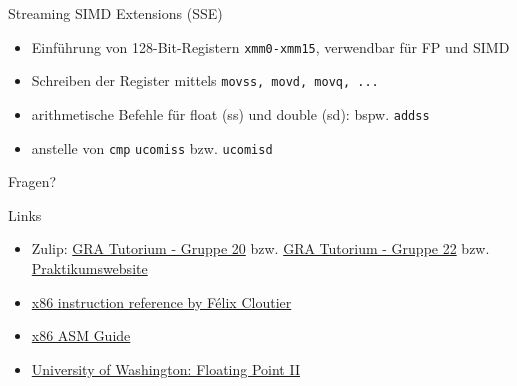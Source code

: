 \documentclass[
  german,            %
  aspectratio=169,    %
]{tumbeamer}
\begin{document}
\begin{frame}[c, fragile]{Streaming SIMD Extensions (SSE)}{}
  \begin{itemize}
    \item Einführung von 128-Bit-Registern \verb|xmm0-xmm15|, verwendbar für FP und SIMD
    \item Schreiben der Register mittels \verb|movss, movd, movq, ...|
    \item arithmetische Befehle für float (ss) und double (sd): bspw. \verb|addss|
    \item anstelle von \verb|cmp| \verb|ucomiss| bzw. \verb|ucomisd|
  \end{itemize}
\end{frame}

\begin{frame}[c]{}{}
  \begin{center}
    \LARGE Fragen?
  \end{center}
\end{frame}

\begin{frame}[fragile, c]{Links}{}
  \begin{itemize}
    \item Zulip: \href{https://zulip.in.tum.de/#narrow/stream/2267-GRA-Tutorium---Gruppe-20}{\glqq GRA Tutorium - Gruppe 20\grqq}
          bzw. \href{https://zulip.in.tum.de/#narrow/stream/2269-GRA-Tutorium---Gruppe-22}{\glqq GRA Tutorium - Gruppe 22\grqq}
          bzw. \href{https://gra.caps.in.tum.de}{\glqq Praktikumswebsite\grqq}
    \item \href{https://www.felixcloutier.com/x86/}{x86 instruction reference by Félix Cloutier}
    \item \href{https://flint.cs.yale.edu/cs421/papers/x86-asm/asm.html}{x86 ASM Guide}
    \item \href{https://courses.cs.washington.edu/courses/cse351/19wi/lectures/07/CSE351-L07-fp-II-x86intro-19wi.pdf}{University of Washington: Floating Point II}
  \end{itemize}
\end{frame}

\maketitle
\end{document}
